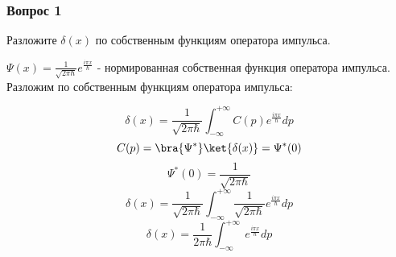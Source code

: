 \subsubsection{Вопрос 1}
Разложите $\delta(x)$  по собственным функциям оператора импульса.

$\Psi(x)=\frac{1}{\sqrt{2\pi \hbar}}e^{\frac{i\pi x}{\hbar}}$ - нормированная собственная функция оператора импульса. Разложим по собственным функциям оператора импульса:

$$\delta(x) = \frac{1}{\sqrt{2\pi \hbar}}\int_{-\infty}^{+\infty} C(p) e^{\frac{i\pi x}{\hbar}} dp$$
$$C(p)=\bra{\Psi^*} \ket{\delta(x)}=\Psi^*(0)$$
$$\Psi^*(0)=\frac{1}{\sqrt{2\pi \hbar}}$$
$$\delta(x) = \frac{1}{\sqrt{2\pi \hbar}}\int_{-\infty}^{+\infty} \frac{1}{\sqrt{2\pi \hbar}} e^{\frac{i\pi x}{\hbar}} dp$$
$$\delta(x) = \frac{1}{2\pi \hbar}\int_{-\infty}^{+\infty} \ e^{\frac{i\pi x}{\hbar}} dp$$